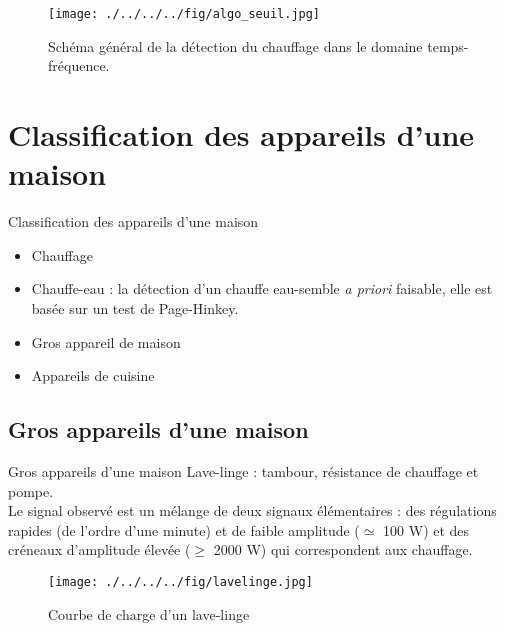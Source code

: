 \documentclass{beamer}
\begin{document}
\begin{frame}
\begin{figure}[!h]
\begin{center}
\texttt{[image: ./../../../fig/algo\_seuil.jpg]}
\caption{Schéma général de la détection du chauffage dans le domaine temps-fréquence.}
\label{Figure8}
\end{center}
\end{figure}
\end{frame}

\section{Classification des appareils d'une maison}
\begin{frame}{Classification des appareils d'une maison}
\begin{itemize}
	\item Chauffage
	\item Chauffe-eau : la détection d'un chauffe eau-semble \textit{a priori} faisable, elle est basée sur un test de Page-Hinkey.
	\item Gros appareil de maison
	\item Appareils de cuisine
\end{itemize}
\end{frame}

\subsection{Gros appareils d'une maison}
\begin{frame}{Gros appareils d'une maison}
Lave-linge : tambour, résistance de chauffage et pompe.\\
\vspace{0.25cm}
Le signal observé est un mélange de deux signaux élémentaires : des régulations rapides (de l'ordre d'une minute) et de faible amplitude ($\simeq$ 100 W) et des créneaux d'amplitude élevée ($\ge$ 2000 W) qui correspondent aux chauffage.
\begin{figure}[!h]
\begin{center}
\texttt{[image: ./../../../fig/lavelinge.jpg]}
\caption{Courbe de charge d'un lave-linge}
\label{Figure9}
\end{center}
\end{figure}
\end{frame}
\end{document}
